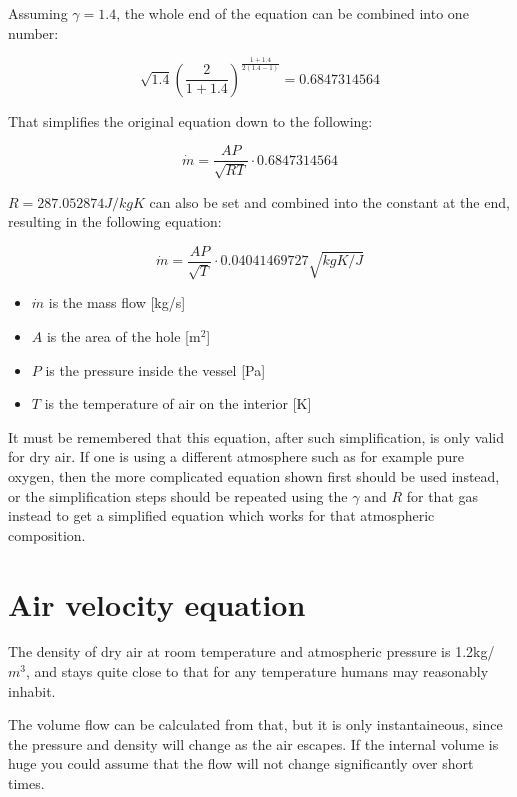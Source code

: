\documentclass[a4paper]{article}
\begin{document}
	\medskip
	
	Assuming $\gamma = 1.4$, the whole end of the equation can be combined into one number:
	
	$$ \sqrt{1.4} \left(\frac{2}{1+1.4}\right)^\frac{1+1.4}{2(1.4-1)} = 0.6847314564 $$
	
	That simplifies the original equation down to the following:
	
	$$ \dot{m} = \frac{AP}{\sqrt{RT}} \cdot 0.6847314564 $$
	
	\medskip
	
	$R = 287.052874J/kgK$ can also be set and combined into the constant at the end, resulting in the following equation:
	
	$$ \dot{m} = \frac{AP}{\sqrt{T}} \cdot 0.04041469727\sqrt{kgK/J} $$
	
	\begin{itemize}
		\item $\dot{m}$ is the mass flow [kg/s]
		
		\item $A$ is the area of the hole [m$^2$]
		
		\item $P$ is the pressure inside the vessel [Pa]
		
		\item $T$ is the temperature of air on the interior [K]
	\end{itemize}
	
	\medskip
	
	It must be remembered that this equation, after such simplification, is only valid for dry air. If one is using a different atmosphere such as for example pure oxygen, then the more complicated equation shown first should be used instead, or the simplification steps should be repeated using the $\gamma$ and $R$ for that gas instead to get a simplified equation which works for that atmospheric composition.
	
	\pagebreak
	
	\section{Air velocity equation}
	
	The density of dry air at room temperature and atmospheric pressure is 1.2kg/$m^3$, and stays quite close to that for any temperature humans may reasonably inhabit.
	
	\medskip
	
	The volume flow can be calculated from that, but it is only instantaineous, since the pressure and density will change as the air escapes. If the internal volume is huge you could assume that the flow will not change significantly over short times.
	
\end{document}

